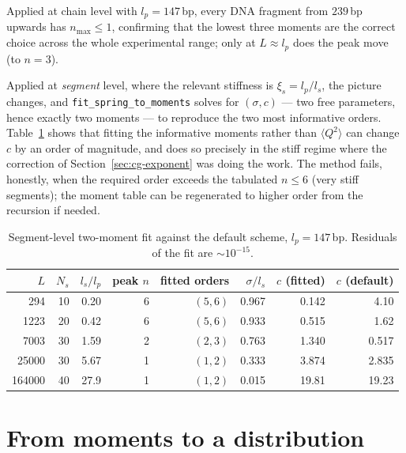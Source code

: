\documentclass[11pt,a4paper]{report}
\newcommand{\code}[1]{\texttt{\seqsplitcode{#1}}}
\newcommand{\seqsplitcode}[1]{#1}
\begin{document}
Applied at chain level with $l_p = 147$\,bp, every DNA fragment from $239$\,bp
upwards has $n_{\max}\le1$, confirming that the lowest three moments are the
correct choice across the whole experimental range; only at $L\approx l_p$ does the
peak move (to $n=3$).

Applied at \emph{segment} level, where the relevant stiffness is $\xi_s = l_p/l_s$,
the picture changes, and \code{fit\_spring\_to\_moments} solves for
$(\sigma, c)$ --- two free parameters, hence exactly two moments --- to reproduce
the two most informative orders. Table~\ref{tab:cg-moments} shows that fitting the
informative moments rather than $\langle Q^{2}\rangle$ can change $c$ by an order
of magnitude, and does so precisely in the stiff regime where the correction of
Section~\ref{sec:cg-exponent} was doing the work. The method fails, honestly, when
the required order exceeds the tabulated $n\le6$ (very stiff segments); the moment
table can be regenerated to higher order from the recursion if needed.

\begin{table}[ht]
\centering
\caption{Segment-level two-moment fit against the default scheme, $l_p = 147$\,bp.
Residuals of the fit are $\sim10^{-15}$.}
\label{tab:cg-moments}
\begin{tabular}{@{}rrrrrrrr@{}}
\toprule
$L$ & $N_s$ & $l_s/l_p$ & peak $n$ & fitted orders & $\sigma/l_s$ & $c$ (fitted) & $c$ (default) \\
\midrule
294    & 10 & 0.20 & 6 & $(5,6)$ & 0.967 & 0.142 & 4.10 \\
1223   & 20 & 0.42 & 6 & $(5,6)$ & 0.933 & 0.515 & 1.62 \\
7003   & 30 & 1.59 & 2 & $(2,3)$ & 0.763 & 1.340 & 0.517 \\
25000  & 30 & 5.67 & 1 & $(1,2)$ & 0.333 & 3.874 & 2.835 \\
164000 & 40 & 27.9 & 1 & $(1,2)$ & 0.015 & 19.81 & 19.23 \\
\bottomrule
\end{tabular}
\end{table}

\section{From moments to a distribution}
\label{sec:cg-hkdist}
\end{document}
